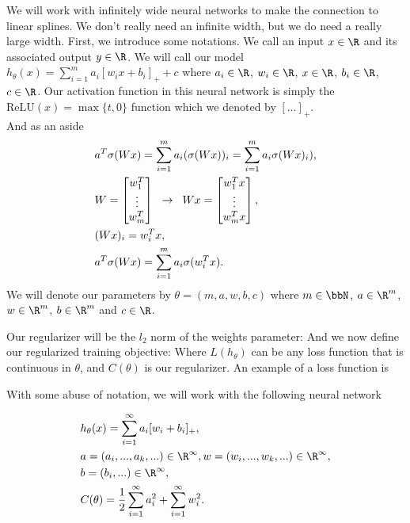 We will work with infinitely wide neural networks to make the connection to linear splines. We don't really need an infinite width, but we do need a really large width. First, we introduce some notations.
We call an input $x \in \R$ and its associated output $y \in \R$. We will call our model $h_{\theta}(x) = \sum_{i=1}^{m} a_i [w_ix + b_i ]_{+} + c$ where $a_i \in \R$, $w_i \in \R$, $x \in \R$, $b_i \in \R$, $c \in \R$. Our activation function in this neural network is simply the $\text{ReLU}(x) = \max\{t, 0\}$ function which we denoted by $[ \dots ]_{+}$. \\
And as an aside
\begin{align*}
& a^T \sigma(Wx) = \sum_{i=1}^{m} a_i (\sigma(Wx))_i  = \sum_{i=1}^{m} a_i \sigma(Wx)_i), \\
& W = \begin{bmatrix} w_1^T \\ \vdots \\ w_m^T \end{bmatrix} \hspace{0.2cm} \rightarrow \hspace{0.2cm}
Wx = \begin{bmatrix} w_1^Tx \\ \vdots \\ w_m^Tx \end{bmatrix}, \\
& (Wx)_i = w_i^Tx, \\
& a^T \sigma(Wx) = \sum_{i=1}^{m} a_i \sigma(w_i^Tx). \\
\end{align*}
We will denote our parameters by $\theta = (m, a, w, b, c)$ where $m \in \bbN$, $a \in \R^m$, $w \in \R^m$, $b \in \R^m$ and $c \in \R$. 

Our regularizer will be the $l_2$ norm of the weights parameter:
And we now define our regularized training objective: 
Where $L(h_{\theta})$ can be any loss function that is continuous in $\theta$, and $C(\theta)$ is our regularizer.  An example of a loss function is

With some abuse of notation, we will work with the following neural network

\begin{align*}
&h_{\theta}(x) = \sum_{i=1}^{\infty} a_i [w_i + b_i]_{+}, \\
& a = (a_i, ..., a_k, ...) \in \R^\infty, w = (w_i, ..., w_k, ...) \in \R^\infty, \\
& b = (b_i, ... ) \in \R^\infty, \\
& C(\theta) = \frac{1}{2} \sum_{i=1}^{\infty} a_i^2 + \sum_{i=1}^{\infty} w_i^2.
\end{align*}

